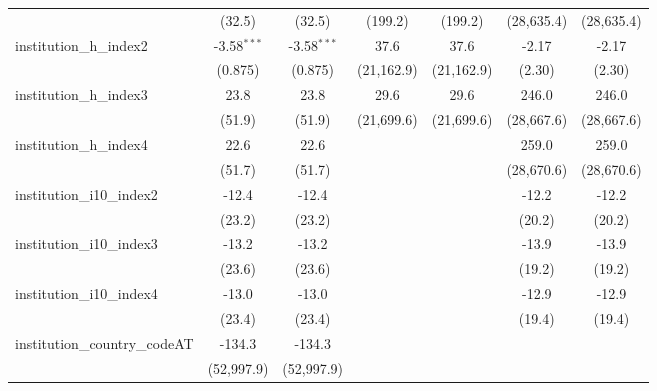 \begin{tabular}{lcccccc}
                                         & (32.5)        & (32.5)        & (199.2)       & (199.2)       & (28,635.4)    & (28,635.4)\\   
   institution\_h\_index2                & -3.58$^{***}$ & -3.58$^{***}$ & 37.6          & 37.6          & -2.17         & -2.17\\   
                                         & (0.875)       & (0.875)       & (21,162.9)    & (21,162.9)    & (2.30)        & (2.30)\\   
   institution\_h\_index3                & 23.8          & 23.8          & 29.6          & 29.6          & 246.0         & 246.0\\   
                                         & (51.9)        & (51.9)        & (21,699.6)    & (21,699.6)    & (28,667.6)    & (28,667.6)\\   
   institution\_h\_index4                & 22.6          & 22.6          &               &               & 259.0         & 259.0\\   
                                         & (51.7)        & (51.7)        &               &               & (28,670.6)    & (28,670.6)\\   
   institution\_i10\_index2              & -12.4         & -12.4         &               &               & -12.2         & -12.2\\   
                                         & (23.2)        & (23.2)        &               &               & (20.2)        & (20.2)\\   
   institution\_i10\_index3              & -13.2         & -13.2         &               &               & -13.9         & -13.9\\   
                                         & (23.6)        & (23.6)        &               &               & (19.2)        & (19.2)\\   
   institution\_i10\_index4              & -13.0         & -13.0         &               &               & -12.9         & -12.9\\   
                                         & (23.4)        & (23.4)        &               &               & (19.4)        & (19.4)\\   
   institution\_country\_codeAT          & -134.3        & -134.3        &               &               &               &   \\   
                                         & (52,997.9)    & (52,997.9)    &               &               &               &   \\   

\end{tabular}
